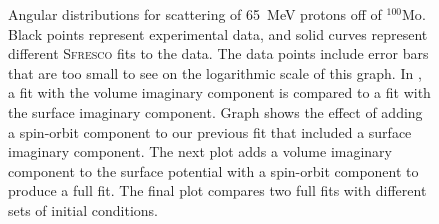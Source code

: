 \documentclass[aps, prc, twocolumn, reprint]{revtex4-1}
\newcommand{\nuc}[2]{${}^{#1}\text{#2}$}
\newcommand{\sfresco}[0]{\textsc{Sfresco}\xspace}
\begin{document}
\begin{figure}
	\caption{Angular distributions for scattering of \SI{65}{MeV} protons off of \nuc{100}{Mo}. Black points represent experimental data, and solid curves represent different \sfresco fits to the data. The data points include error bars that are too small to see on the logarithmic scale of this graph. In \protect{}, a fit with the volume imaginary component is compared to a fit with the surface imaginary component. Graph \protect{} shows the effect of adding a spin-orbit component to our previous fit that included a surface imaginary component. The next plot \protect{} adds a volume imaginary component to the surface potential with a spin-orbit component to produce a full fit. The final plot \protect{} compares two full fits with different sets of initial conditions.}
	\label{fig:fits}
\end{figure}
\end{document}
